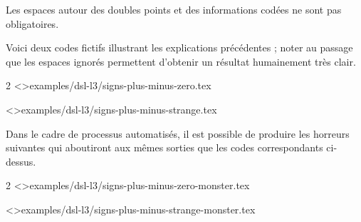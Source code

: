 \documentclass{tutodoc}
\begin{document}






\begin{tdocnote}
    Les espaces autour des doubles points et des informations codées ne sont pas obligatoires.
\end{tdocnote}




Voici deux codes fictifs illustrant les explications précédentes ; noter au passage que les espaces ignorés permettent d'obtenir un résultat humainement très clair.
\begin{multicols}{2}
    \tdoclatexinput<>{examples/dsl-l3/signs-plus-minus-zero.tex}

    \tdoclatexinput<>{examples/dsl-l3/signs-plus-minus-strange.tex}
\end{multicols}

Dans le cadre de processus automatisés, il est possible de produire les horreurs suivantes qui aboutiront aux mêmes sorties que les codes correspondants ci-dessus.
\begin{multicols}{2}
    \tdoclatexinput<>{examples/dsl-l3/signs-plus-minus-zero-monster.tex}

    \tdoclatexinput<>{examples/dsl-l3/signs-plus-minus-strange-monster.tex}
\end{multicols}
\end{document}
